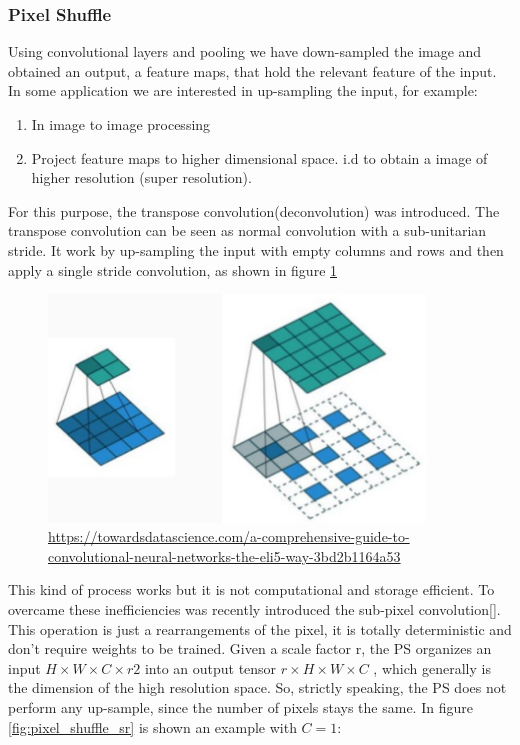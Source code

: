 \documentclass[a4paper, 10pt]{book}
\begin{document}
\subsubsection{Pixel Shuffle}
Using convolutional layers and pooling we have down-sampled the image and obtained an output, a feature maps, 
that hold the relevant feature of the input. In some application we are  interested in up-sampling the input, for example:
\begin{enumerate}
\item	In image to image processing
\item	Project feature maps to higher dimensional space. i.d to obtain a image of higher resolution (super resolution).
\end{enumerate}
For this purpose, the transpose convolution(deconvolution) was  introduced.
The transpose convolution can be seen as normal convolution with a sub-unitarian stride.
It work by up-sampling the input with empty columns and rows and then apply a  single stride convolution, as shown in figure \ref{fig:pixel_shuffle}
\begin{figure}[htp]
    \centering
    \includegraphics[width=10cm]{deconv.png}
    \caption{\href{text}{https://towardsdatascience.com/a-comprehensive-guide-to-convolutional-neural-networks-the-eli5-way-3bd2b1164a53 }}
    \label{fig:pixel_shuffle}
\end{figure}
This kind of process works but it is not computational and storage efficient.
To overcame these inefficiencies was recently introduced the sub-pixel convolution[].
This operation is just a rearrangements  of the pixel, it is totally deterministic and don’t require weights to be trained. 
Given a scale factor r, the PS organizes an input $H \times W \times C \times r2$ into an output tensor $ r \times H \times W \times C$ , which generally is the dimension of the high resolution space.
So, strictly speaking, the PS does not perform any up-sample, since the number of pixels stays the same. In figure \ref{fig:pixel_shuffle_sr} is shown an example with $ C = 1$:
\end{document}
